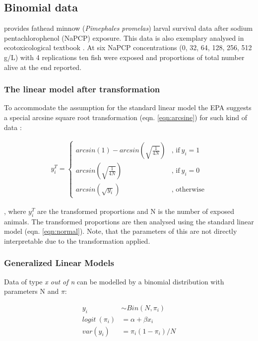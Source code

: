 \documentclass{scrartcl}
\begin{document}
\subsection{Binomial data}
\citet{weber_short-term_1989} provides fathead minnow (\textit{Pimephales promelas}) larval survival data after sodium pentachlorophenol (NaPCP) exposure.
This data is also exemplary analysed in ecotoxicological textbook \citet{newman_quantitative_2012}.
At six NaPCP concentrations (0, 32, 64, 128, 256, 512 \textmu g/L) with 4 replications ten fish were exposed and proportions of total number alive at the end reported.

\subsubsection{The linear model after transformation}
To accommodate the assumption for the standard linear model the EPA suggests a special arcsine square root transformation (eqn. \ref{eqn:arcsine}) for such kind of data \citep{epa_methods_2002}:

\begin{align}
  y_i^T = 
  \begin{cases}  
    arcsin(1) - arcsin(\sqrt{\frac{1}{4N}}) & \text{, if}\ y_i = 1 \\
    arcsin(\sqrt{\frac{1}{4N}}) & \text{, if}\ y_i = 0  \\
    arcsin(\sqrt{y_i}) & \text{, otherwise}
  \end{cases} \label{eqn:arcsine}
\end{align}

, where $y_i^T$ are the transformed proportions and N is the number of exposed animals.
The transformed proportions are then analysed using the standard linear model (eqn. \ref{eqn:normal}).
Note, that the parameters of this are not directly interpretable due to the transformation applied.


\subsubsection{Generalized Linear Models}
Data of type \emph{x out of n} can be modelled by a binomial distribution with parameters N and $\pi$:

\begin{align}
  y_i &\sim Bin(N, \pi_i) \nonumber \\
  logit~(\pi_i) &= \alpha + \beta x_i \label{eqn:bin} \\
  var(y_i) &=  \pi_i (1 - \pi_i) / N \nonumber
\end{align}
\end{document}
